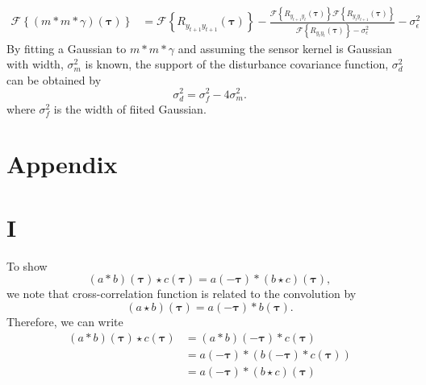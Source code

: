 \documentclass[]{article}
\begin{document}
\begin{align}
 \mathcal F\left\lbrace (m\ast m \ast \gamma)(\boldsymbol\tau)\right\rbrace&= \mathcal F\left\lbrace R_{y_{t+1}y_{t+1}}(\boldsymbol{\tau})\right\rbrace-\frac{\mathcal F\left\lbrace R_{y_{t+1}y_t}(\boldsymbol{\tau})\right\rbrace \mathcal F \left\lbrace R_{y_{t}y_{t+1}}(\boldsymbol{\tau})\right\rbrace}{\mathcal F \left\lbrace R_{y_ty_t}(\boldsymbol{\tau})\right\rbrace-\sigma_{\epsilon}^2}-\sigma_{\epsilon}^2
\end{align}
By fitting a Gaussian to $m\ast m \ast \gamma$ and assuming the sensor kernel is Gaussian with width, $\sigma^2_m$ is known, the support of the disturbance covariance function, $\sigma^2_d$ can be obtained by
\begin{equation}
 \sigma_d^2=\sigma_f^2-4\sigma_m^2.
\end{equation}
where $\sigma_f^2$ is the width of fiited Gaussian.


\section*{Appendix}
\appendix
\section*{I}
To show 
\begin{equation}
 \left(a \ast b \right)\left(\boldsymbol\tau\right)  \star c\left(\boldsymbol\tau\right)  = a\left(-\boldsymbol\tau\right)\ast\left(b \star c\right)\left(\boldsymbol\tau\right),
\end{equation}
we note that cross-correlation function is related to the convolution by \cite{Yarlagadda2009}
\begin{equation}
 \left(a \star b\right)\left(\boldsymbol\tau\right)= a\left(-\boldsymbol\tau \right)\ast b\left(\boldsymbol\tau\right).
\end{equation}
Therefore, we can write
\begin{align}
 \left(a \ast b\right)\left(\boldsymbol\tau\right) \star c\left(\boldsymbol\tau\right)&= \left(a \ast b\right)\left(-\boldsymbol\tau \right)\ast c\left(\boldsymbol\tau\right) \nonumber \\
&=a\left(-\boldsymbol\tau\right)\ast \left(b\left(-\boldsymbol\tau\right) \ast c\left(\boldsymbol\tau\right)\right)\nonumber \\
&=a\left(-\boldsymbol\tau\right)\ast\left(b\star c\right)\left(\boldsymbol\tau\right)
\end{align}
\end{document}
